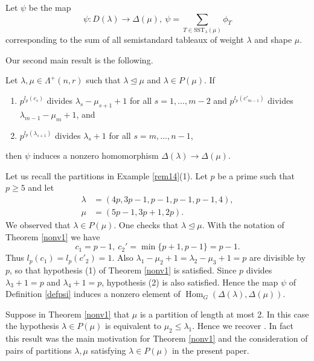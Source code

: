 \documentclass[ALCO,Unicode]{cedram}
\newcommand{\la}{\lambda}
\newcommand{\La}{\Lambda}
\DeclareMathOperator{\Hom}{Hom}
\numberwithin{equation}{section}
\begin{document}
\begin{defi}\label{defpsi}Let $\psi$ be the map \[\psi : D(\la) \to \Delta(\mu), \ \psi = \sum_{T \in \mathrm{SST}_{\la}(\mu)}\phi_T \] corresponding to the sum of all semistandard tableaux of weight $\lambda$ and shape $\mu$. \end{defi} Our second main result  is the following.
\begin{theo}\label{nonv1}
	Let $\la, \mu \in \La^{+}(n,r)$ such that $\la \unlhd \mu$ and $\la \in P(\mu)$. If 
		\begin{enumerate}
		\item $p^{l_p(c_s)}$ divides $\la_s-\mu_{s+1}+1$ for all $s=1,\dots,m-2$  and $p^{l_p(c'_{m-1})}$ divides $\la_{m-1}-\mu_{m}+1$, and
		\item $p^{l_p(\lambda_{s+1})}$ divides $\la_s+1$ for all $s=m,\dots,n-1$,
	\end{enumerate}
	then $\psi$ induces a nonzero homomorphism $\Delta(\la) \to \Delta(\mu)$.
\end{theo}
	\begin{exam}\label{exhom} Let us recall the partitions in Example \ref{rem14}(1). Let $p$ be a prime such that $p \ge 5$ and let \begin{align*}\lambda&=(4p, 3p-1, p-1, p-1, p-1, 4), \\ \mu &=(5p-1, 3p+1, 2p). \end{align*}
	We observed that $\lambda \in P(\mu)$. One checks that $\la \unlhd \mu$. With the notation of Theorem \ref{nonv1} we have \[c_1=p-1, \ c_2' =\min\{p+1, p-1\}=p-1. \] Thus $l_p(c_1)=l_p(c'_2)=1$. Also $\lambda_1-\mu_2+1=\lambda_2 - \mu_3 + 1=p$ are divisible by $p$, so that hypothesis (1) of Theorem \ref{nonv1} is satisfied. Since $p$ divides  $\lambda_3 +1 =p$ and $\lambda_4 +1=p$, hypothesis (2) is also satisfied. Hence the map $\psi$ of Definition \ref{defpsi} induces a nonzero element of $\Hom_G(\Delta(\lambda), \Delta(\mu))$. \end{exam}
	\begin{rema}
	Suppose in Theorem \ref{nonv1} that $\mu$ is a partition of length at most 2. In this case the hypothesis $\lambda \in P(\mu)$ is equivalent to $\mu_2 \le \la_1$. Hence we recover \cite[Theorem 3.1]{MS3}. In fact this result was the main motivation for Theorem \ref{nonv1} and the consideration of pairs of partitions $\lambda, \mu$ satisfying $\lambda \in P(\mu)$ in the present paper.
	\end{rema}
	
\end{document}
